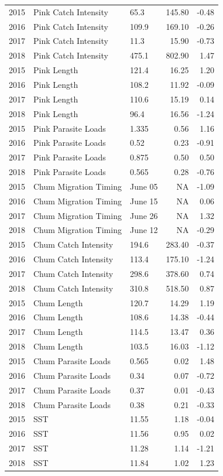\documentclass[fleqn,10pt]{wlpeerj} %
\begin{document}
\begin{longtable}[]{@{}rllrr@{}}
2015 & Pink Catch Intensity & 65.3 & 145.80 & -0.48\tabularnewline
2016 & Pink Catch Intensity & 109.9 & 169.10 & -0.26\tabularnewline
2017 & Pink Catch Intensity & 11.3 & 15.90 & -0.73\tabularnewline
2018 & Pink Catch Intensity & 475.1 & 802.90 & 1.47\tabularnewline
2015 & Pink Length & 121.4 & 16.25 & 1.20\tabularnewline
2016 & Pink Length & 108.2 & 11.92 & -0.09\tabularnewline
2017 & Pink Length & 110.6 & 15.19 & 0.14\tabularnewline
2018 & Pink Length & 96.4 & 16.56 & -1.24\tabularnewline
2015 & Pink Parasite Loads & 1.335 & 0.56 & 1.16\tabularnewline
2016 & Pink Parasite Loads & 0.52 & 0.23 & -0.91\tabularnewline
2017 & Pink Parasite Loads & 0.875 & 0.50 & 0.50\tabularnewline
2018 & Pink Parasite Loads & 0.565 & 0.28 & -0.76\tabularnewline
2015 & Chum Migration Timing & June 05 & NA & -1.09\tabularnewline
2016 & Chum Migration Timing & June 15 & NA & 0.06\tabularnewline
2017 & Chum Migration Timing & June 26 & NA & 1.32\tabularnewline
2018 & Chum Migration Timing & June 12 & NA & -0.29\tabularnewline
2015 & Chum Catch Intensity & 194.6 & 283.40 & -0.37\tabularnewline
2016 & Chum Catch Intensity & 113.4 & 175.10 & -1.24\tabularnewline
2017 & Chum Catch Intensity & 298.6 & 378.60 & 0.74\tabularnewline
2018 & Chum Catch Intensity & 310.8 & 518.50 & 0.87\tabularnewline
2015 & Chum Length & 120.7 & 14.29 & 1.19\tabularnewline
2016 & Chum Length & 108.6 & 14.38 & -0.44\tabularnewline
2017 & Chum Length & 114.5 & 13.47 & 0.36\tabularnewline
2018 & Chum Length & 103.5 & 16.03 & -1.12\tabularnewline
2015 & Chum Parasite Loads & 0.565 & 0.02 & 1.48\tabularnewline
2016 & Chum Parasite Loads & 0.34 & 0.07 & -0.72\tabularnewline
2017 & Chum Parasite Loads & 0.37 & 0.01 & -0.43\tabularnewline
2018 & Chum Parasite Loads & 0.38 & 0.21 & -0.33\tabularnewline
2015 & SST & 11.55 & 1.18 & -0.04\tabularnewline
2016 & SST & 11.56 & 0.95 & 0.02\tabularnewline
2017 & SST & 11.28 & 1.14 & -1.21\tabularnewline
2018 & SST & 11.84 & 1.02 & 1.23\tabularnewline
\bottomrule
\end{longtable}
\end{document}
